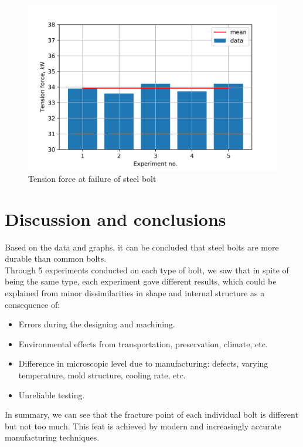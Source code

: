 \begin{figure}
	\centering
	\includegraphics[width=150mm]{Exp2sb.png}
	\caption{Tension force at failure of steel bolt}
\end{figure}
\section{Discussion and conclusions}
Based on the data and graphs, it can be concluded that steel bolts are more durable than common bolts.\\
Through 5 experiments conducted on each type of bolt, we saw that in spite of being the same type, each experiment gave different results, which could be explained from minor dissimilarities in shape and internal structure as a consequence of:
\begin{itemize}
	\item Errors during the designing and machining.
	\item Environmental effects from transportation, preservation, climate, etc.
	\item Difference in microscopic level due to manufacturing: defects, varying temperature, mold structure, cooling rate, etc.
	\item Unreliable testing.
\end{itemize}
In summary, we can see that the fracture point of each individual bolt is different but not too much. This feat is achieved by modern and increasingly accurate manufacturing techniques.